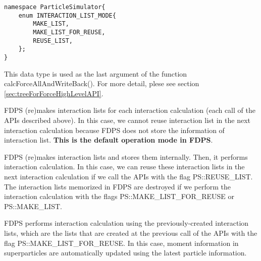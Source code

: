 
\begin{lstlisting}[caption=interaction\_list\_mode]
namespace ParticleSimulator{
    enum INTERACTION_LIST_MODE{
        MAKE_LIST,
        MAKE_LIST_FOR_REUSE,
        REUSE_LIST,
    };
}
\end{lstlisting}

This data type is used as the last argument of the function
calcForceAllAndWriteBack(). For more detail, plese see
section \ref{sec:treeForForceHighLevelAPI}.



FDPS (re)makes interaction lists for each interaction calculation
(each call of the APIs described above). In this case, we cannot reuse
interaction list in the next interaction calculation because FDPS does
not store the information of interaction list. \textbf{This is the
default operation mode in FDPS}.





FDPS (re)makes interaction lists and stores them internally. Then, it
performs interaction calculation. In this case, we can reuse these
interaction lists in the next interaction calculation if we call the
APIs with the flag PS::REUSE\_LIST. The interaction lists memorized in
FDPS are destroyed if we perform the interaction calculation with the
flags PS::MAKE\_LIST\_FOR\_REUSE or PS::MAKE\_LIST.\\



FDPS performs interaction calculation using the previously-created
interaction lists, which are the lists that are created at the
previous call of the APIs with the flag PS::MAKE\_LIST\_FOR\_REUSE. In
this case, moment information in superparticles are automatically
updated using the latest particle information.\\

